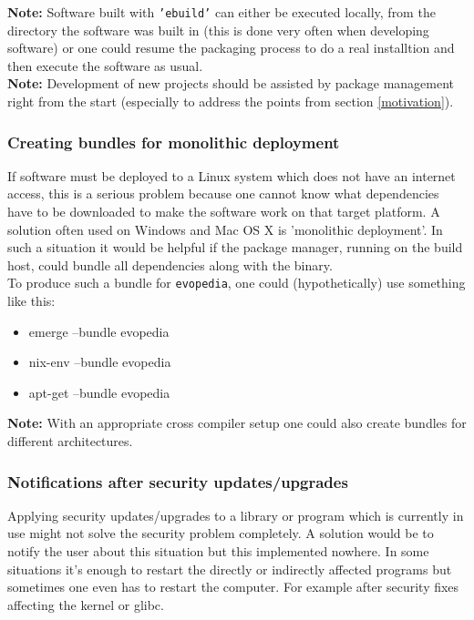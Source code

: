 \documentclass[a4paper,10pt]{article}
\begin{document}
\textbf{Note:} Software built with \texttt{'ebuild'} can either be executed locally, from the directory the software was built in (this is done very often when developing software) or one could resume the packaging process to do a real installtion and then execute the software as usual.\\

\textbf{Note:} Development of new projects should be assisted by package management right from the start (especially to address the points from section \ref{motivation}).








\subsubsection{Creating bundles for monolithic deployment}
If software must be deployed to a Linux system which does not have an internet access, this is a serious problem because one cannot know what dependencies have to be downloaded to make the software work on that target platform. A solution often used on Windows and Mac OS X is 'monolithic deployment'. In such a situation it would be helpful if the package manager, running on the build host, could bundle all dependencies along with the binary.\\

To produce such a bundle for \texttt{evopedia}, one could (hypothetically) use something like this:
\begin{itemize}
\item emerge --bundle evopedia
\item nix-env --bundle evopedia
\item apt-get --bundle evopedia
\end{itemize}
 
\textbf{Note:} With an appropriate cross compiler setup one could also create bundles for different architectures.


















\subsubsection{Notifications after security updates/upgrades}
Applying security updates/upgrades to a library or program which is currently in use might not solve the security problem completely. A solution would be to notify the user about this situation but this implemented nowhere. In some situations it's enough to restart the directly or indirectly affected programs but sometimes one even has to restart the computer. For example after security fixes affecting the kernel or glibc.\\
\end{document}
